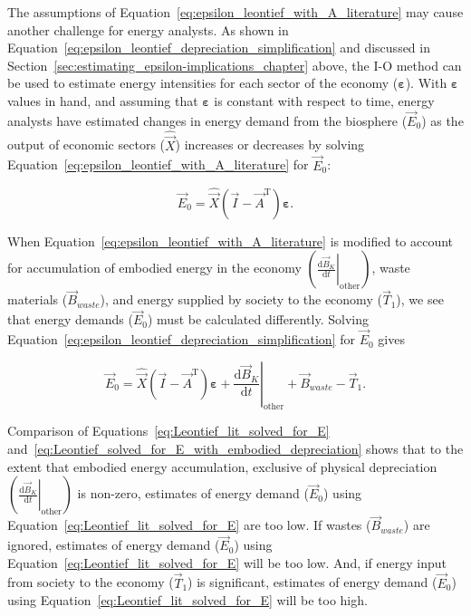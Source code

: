The assumptions of Equation~\ref{eq:epsilon_leontief_with_A_literature}
may cause another challenge for energy analysts. 
As shown in 
Equation~\ref{eq:epsilon_leontief_depreciation_simplification}
and discussed in Section~\ref{sec:estimating_epsilon-implications_chapter} above, 
the I-O method can be used to estimate energy intensities 
for each sector of the economy ($\bm{\varepsilon}$). 
With $\bm{\varepsilon}$ values in hand,
and assuming that $\bm{\varepsilon}$ is constant with respect to time,
energy analysts have estimated changes in energy demand 
from the biosphere ($\vec{E}_{0}$) 
as the output of economic sectors ($\hat{\vec{X}}$) 
increases or decreases by solving 
Equation~\ref{eq:epsilon_leontief_with_A_literature} 
for $\vec{E}_{0}$:

\begin{equation} \label{eq:Leontief_lit_solved_for_E}
	\vec{E}_{0} 
	= \hat{\vec{X}}(\vec{I} - \vec{A}^{\mathrm{T}})\bm{\varepsilon}.
\end{equation}

When Equation~\ref{eq:epsilon_leontief_with_A_literature}
is modified to account for accumulation of embodied energy 
in the economy 
$\left( \left. \frac{\mathrm{d}\vec{B}_{K}}{\mathrm{d}t} \right|_{\mathrm{other}} \right)$,
waste materials ($\vec{B}_{waste}$), and
energy supplied by society to the economy ($\vec{T}_{1}$),
we see that energy demands ($\vec{E}_{0}$) must be calculated differently. 
Solving Equation~\ref{eq:epsilon_leontief_depreciation_simplification} 
for $\vec{E}_{0}$ gives 

\begin{equation} \label{eq:Leontief_solved_for_E_with_embodied_depreciation}
	\vec{E}_{0} 
	= \hat{\vec{X}}
		(\vec{I} - \vec{A}^{\mathrm{T}})
		\bm{\varepsilon} 
	+ \left. \frac{\mathrm{d}\vec{B}_{K}}{\mathrm{d}t} \right|_{\mathrm{other}}
	+ \vec{B}_{waste}
	- \vec{T}_{1}.
\end{equation}

\noindent{}Comparison of Equations~\ref{eq:Leontief_lit_solved_for_E} 
and~\ref{eq:Leontief_solved_for_E_with_embodied_depreciation}
shows that to the extent that embodied energy accumulation,
exclusive of physical depreciation
$\left( \left. \frac{\mathrm{d}\vec{B}_{K}}{\mathrm{d}t} \right|_{\mathrm{other}} \right)$
is non-zero, estimates of energy demand ($\vec{E}_{0}$) using 
Equation~\ref{eq:Leontief_lit_solved_for_E} are too low. 
If wastes ($\vec{B}_{waste}$) are ignored, 
estimates of energy demand ($\vec{E}_{0}$) using 
Equation~\ref{eq:Leontief_lit_solved_for_E} will be too low. 
And, if energy input from society to the economy ($\vec{T}_{1}$) is significant,
estimates of energy demand ($\vec{E}_{0}$) using 
Equation~\ref{eq:Leontief_lit_solved_for_E} will be too high. 

